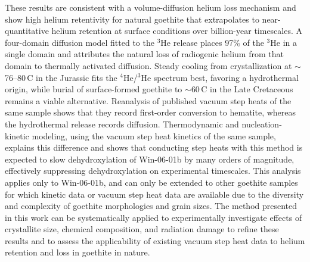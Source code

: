 These results are consistent with a volume-diffusion helium loss
mechanism and show high helium retentivity for natural goethite 
that extrapolates to near-quantitative helium retention at
surface conditions over billion-year timescales. A four-domain diffusion model fitted to the $^3$He release places 97\% of the $^3$He in a
single domain and attributes the natural loss of radiogenic helium from that domain to
thermally activated diffusion. Steady cooling from crystallization at $\sim$76--80\,\textdegree C
in the Jurassic fits the $^4$He/$^3$He spectrum best, favoring a hydrothermal origin, while
burial of surface-formed goethite to $\sim$60\,\textdegree C in the Late Cretaceous remains a
viable alternative. Reanalysis of published vacuum step heats of the same sample
shows that they record first-order conversion to hematite, whereas the hydrothermal release
records diffusion. Thermodynamic and
nucleation-kinetic modeling, using the vacuum step heat kinetics of the same sample,
explains this difference and shows that conducting step heats with this method is expected to
slow dehydroxylation of Win-06-01b by many orders of magnitude, effectively suppressing dehydroxylation on 
experimental timescales. This analysis applies only to Win-06-01b, and can only be extended to other 
goethite samples for which kinetic data or vacuum step heat data are available due to the diversity and complexity 
of goethite morphologies and grain sizes. The method
presented in this work can be systematically applied to experimentally
investigate effects of crystallite size, chemical composition, and
radiation damage to refine these results and to assess the applicability
of existing vacuum step heat data to helium retention and loss in
goethite in nature.
